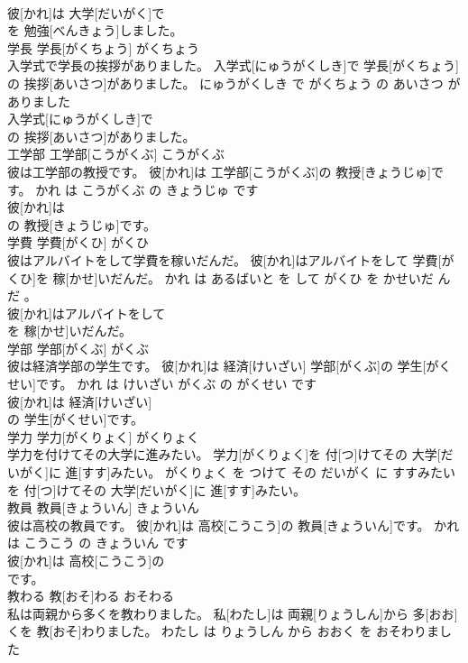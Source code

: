 \documentclass[8pt]{extreport}
\begin{document}
\begin{CJK}{UTF8}{min}
\\	彼[かれ]は 大学[だいがく]で
\\	を 勉強[べんきょう]しました。			
\\	学長	学長[がくちょう]	がくちょう	
\\	入学式で学長の挨拶がありました。	入学式[にゅうがくしき]で 学長[がくちょう]の 挨拶[あいさつ]がありました。	にゅうがくしき で がくちょう の あいさつ が ありました	
\\	入学式[にゅうがくしき]で
\\	の 挨拶[あいさつ]がありました。			
\\	工学部	工学部[こうがくぶ]	こうがくぶ	
\\	彼は工学部の教授です。	彼[かれ]は 工学部[こうがくぶ]の 教授[きょうじゅ]です。	かれ は こうがくぶ の きょうじゅ です	
\\	彼[かれ]は
\\	の 教授[きょうじゅ]です。			
\\	学費	学費[がくひ]	がくひ	
\\	彼はアルバイトをして学費を稼いだんだ。	彼[かれ]はアルバイトをして 学費[がくひ]を 稼[かせ]いだんだ。	かれ は あるばいと を して がくひ を かせいだ ん だ 。	
\\	彼[かれ]はアルバイトをして
\\	を 稼[かせ]いだんだ。			
\\	学部	学部[がくぶ]	がくぶ	
\\	彼は経済学部の学生です。	彼[かれ]は 経済[けいざい] 学部[がくぶ]の 学生[がくせい]です。	かれ は けいざい がくぶ の がくせい です	
\\	彼[かれ]は 経済[けいざい]
\\	の 学生[がくせい]です。			
\\	学力	学力[がくりょく]	がくりょく	
\\	学力を付けてその大学に進みたい。	学力[がくりょく]を 付[つ]けてその 大学[だいがく]に 進[すす]みたい。	がくりょく を つけて その だいがく に すすみたい	
\\	を 付[つ]けてその 大学[だいがく]に 進[すす]みたい。			
\\	教員	教員[きょういん]	きょういん	
\\	彼は高校の教員です。	彼[かれ]は 高校[こうこう]の 教員[きょういん]です。	かれ は こうこう の きょういん です	
\\	彼[かれ]は 高校[こうこう]の
\\	です。			
\\	教わる	教[おそ]わる	おそわる	
\\	私は両親から多くを教わりました。	私[わたし]は 両親[りょうしん]から 多[おお]くを 教[おそ]わりました。	わたし は りょうしん から おおく を おそわりました	

\end{CJK}
\end{document}
